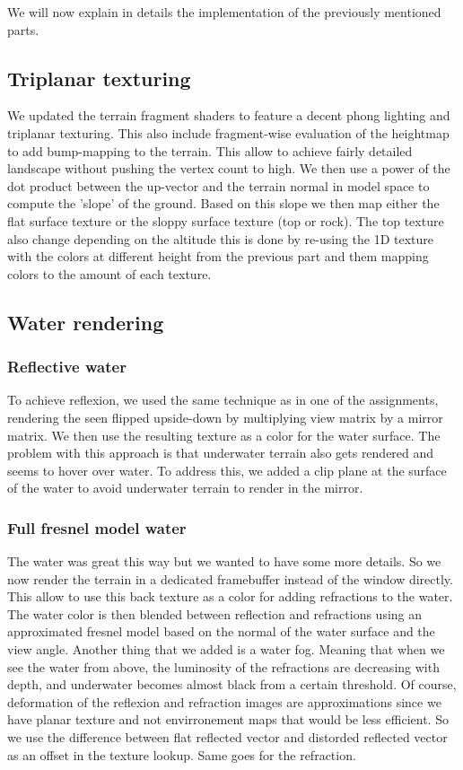 \documentclass[11pt]{article}
\begin{document}
We will now explain in details the implementation of the previously mentioned
parts. 

\subsection{Triplanar texturing}

We updated the terrain fragment shaders to feature a decent phong lighting and
triplanar texturing. This also include fragment-wise evaluation of the heightmap
to add bump-mapping to the terrain. This allow to achieve fairly detailed
landscape without pushing the vertex count to high. We then use a power of the
dot product between the up-vector and the terrain normal in model space to
compute the 'slope' of the ground. Based on this slope we then map either the
flat surface texture or the sloppy surface texture (top or rock). The top
texture also change depending on the altitude this is done by re-using the 1D
texture with the colors at different height from the previous part and them
mapping colors to the amount of each texture.

\subsection{Water rendering}

\subsubsection{Reflective water}

To achieve reflexion, we used the same technique as in one of the assignments,
rendering the seen flipped upside-down by multiplying view matrix by a mirror
matrix. We then use the resulting texture as a color for the water surface. The
problem with this approach is that underwater terrain also gets rendered and
seems to hover over water. To address this, we added a clip plane at the surface
of the water to avoid underwater terrain to render in the mirror. 

\subsubsection{Full fresnel model water}

The water was great this way but we wanted to have some more details. So we now
render the terrain in a dedicated framebuffer instead of the window directly.
This allow to use this back texture as a color for adding refractions to  the
water. The water color is then blended between reflection and refractions using
an approximated fresnel model based on the normal of the water surface and the
view angle. Another thing that we added is a water fog. Meaning that when we see
the water from above, the luminosity of the refractions are decreasing with
depth, and underwater becomes almost black from a certain threshold. Of course,
deformation of the reflexion and refraction images are approximations since we
have planar texture and not envirronement maps that would be less efficient. So
we use the difference between flat reflected vector and distorded reflected
vector as an offset in the texture lookup. Same goes for the refraction.
\end{document}
